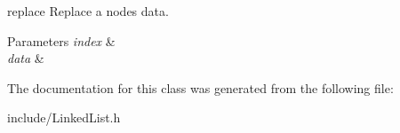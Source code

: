 replace Replace a node\textquotesingle{}s data. 


\begin{DoxyParams}{Parameters}
{\em index} & \\
\hline
{\em data} & \\
\hline
\end{DoxyParams}


The documentation for this class was generated from the following file\+:\begin{DoxyCompactItemize}
\item 
include/Linked\+List.\+h\end{DoxyCompactItemize}
